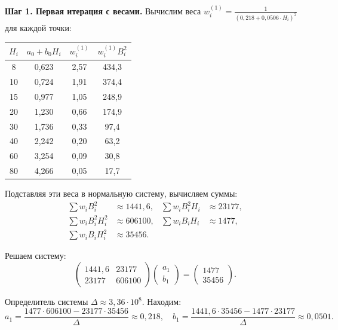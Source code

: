 \documentclass{article}
\begin{document}
\textbf{Шаг 1. Первая итерация с весами.}
Вычислим веса $w_i^{(1)} = \frac{1}{(0{,}218 + 0{,}0506 \cdot H_i)^2}$ для каждой точки:
\begin{center}
\begin{tabular}{|c|c|c|c|}
\hline
$H_i$ & $a_0 + b_0 H_i$ & $w_i^{(1)}$ & $w_i^{(1)} B_i^2$ \\
\hline
8 & 0,623 & 2,57 & 434,3 \\
10 & 0,724 & 1,91 & 374,4 \\
15 & 0,977 & 1,05 & 248,9 \\
20 & 1,230 & 0,66 & 174,9 \\
30 & 1,736 & 0,33 & 97,4 \\
40 & 2,242 & 0,20 & 63,2 \\
60 & 3,254 & 0,09 & 30,8 \\
80 & 4,266 & 0,05 & 17,7 \\
\hline
\end{tabular}
\end{center}

Подставляя эти веса в нормальную систему, вычисляем суммы:
\begin{align*}
\sum w_i B_i^2 &\approx 1441,6, & \sum w_i B_i^2 H_i &\approx 23177, \\
\sum w_i B_i^2 H_i^2 &\approx 606100, & \sum w_i B_i H_i &\approx 1477, \\
\sum w_i B_i H_i^2 &\approx 35456. & &
\end{align*}

Решаем систему:
\begin{equation}
\begin{pmatrix}
1441{,}6 & 23177 \\
23177 & 606100
\end{pmatrix}
\begin{pmatrix}
a_1 \\ b_1
\end{pmatrix}
=
\begin{pmatrix}
1477 \\ 35456
\end{pmatrix}.
\end{equation}

Определитель системы $\Delta \approx 3{,}36 \cdot 10^8$. Находим:
\begin{equation}
a_1 = \frac{1477 \cdot 606100 - 23177 \cdot 35456}{\Delta} \approx 0{,}218, \quad
b_1 = \frac{1441{,}6 \cdot 35456 - 1477 \cdot 23177}{\Delta} \approx 0{,}0501.
\end{equation}
\end{document}
